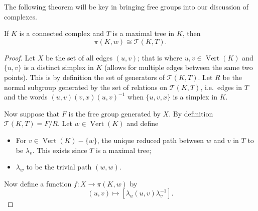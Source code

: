 The following theorem will be key in bringing free groups into our discussion of complexes.

\begin{theorem}[Tietze's]
  If $K$ is a connected complex and $T$ is a maximal tree in $K$, then
  \[
    \pi(K,w) \cong \mathcal{T}(K,T).
  \]
\end{theorem}

\begin{proof}
  Let $X$ be the set of all edges $(u,v)$; that is where $u,v \in \operatorname{Vert}(K)$ and $\{ u,v \}$ is a distinct simplex in $K$ (allows for multiple edges between the same two points). This is by definition the set of generators of $\mathcal{T}(K,T)$. Let $R$ be the normal subgroup generated by the set of relations on $\mathcal{T}(K,T)$, i.e.\ edges in $T$ and the words $(u,v)(v,x)(u,v)^{-1}$ when $\{u,v,x \}$ is a simplex in $K$.

  Now suppose that $F$ is the free group generated by $X$. By definition $\mathcal{T}(K,T) = F/R$. Let $w \in \operatorname{Vert}(K)$ and define
  \begin{itemize}
  \item For $v \in \operatorname{Vert}(K) - \{w\}$, the unique reduced path between $w$ and $v$ in $T$ to be $\lambda_v$. This exists since $T$ is a maximal tree;
  \item $\lambda_w$ to be the trivial path $(w,w)$.
  \end{itemize}

Now define a function $f:X \rightarrow \pi(K,w)$ by
\begin{equation*}
  (u,v) \mapsto [\lambda_u(u,v)\lambda_v^{-1}].
\end{equation*}


\end{proof}
